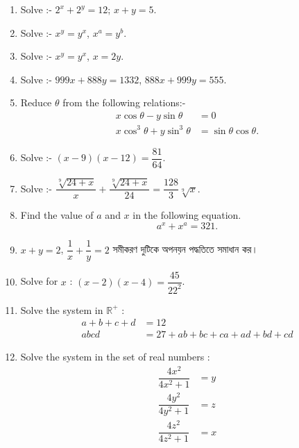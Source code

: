 \documentclass[11pt, a4paper]{article}
\begin{document}
\begin{enumerate}

	\item Solve :- $ 2^x + 2^y = 12  $; $ x+y = 5 $.
	\item Solve :- $ x^y = y^x $, $ x^a = y^b $.
	
	\item Solve :- $ x^y = y^x $, $ x = 2y $.
	
	\item Solve :- $ 999x + 888y = 1332 $, $ 888x + 999y = 555 $.

	\item Reduce $\theta$ from the following relations:-
	\begin{align*}
	x\cos \theta - y \sin \theta &= 0 \\
	x\cos^3 \theta + y \sin^3 \theta &= \sin \theta \cos \theta.
	\end{align*}
	
	\item Solve :- $\left( x - 9 \right) \left( x - 12 \right) = \dfrac{81}{64}$.
	
	\item Solve :- $\dfrac{\sqrt[9]{24+x}}{x} + \dfrac{\sqrt[9]{24+x}}{24} = \dfrac{128}{3} \sqrt[9]{x}$.
	
	\item Find the value of $a$ and $x$ in the following equation. $$a^x + x^a = 321.$$
	
	\item $x + y = 2$, $ \dfrac{1}{x} + \dfrac{1}{y} = 2$ \textbengali{সমীকরণ দুটিকে অপনয়ন পদ্ধতিতে সমাধান কর।}
	
	\item Solve for $x$ : $(x-2)(x-4) = \dfrac{45}{22^2}$.
	
	\item Solve the system in $\mathbb{R^+}$ :
	\begin{align*}
	a + b + c + d &= 12 \\
	abcd &= 27 + ab + bc + ca + ad + bd + cd
	\end{align*}

	\item Solve the system in the set of real numbers :
	\begin{align*}
	\dfrac{4x^2}{4x^2 + 1} &= y \\
	\dfrac{4y^2}{4y^2 + 1} &= z \\
	\dfrac{4z^2}{4z^2 + 1} &= x \\
	\end{align*}
	

\end{enumerate}
\end{document}
